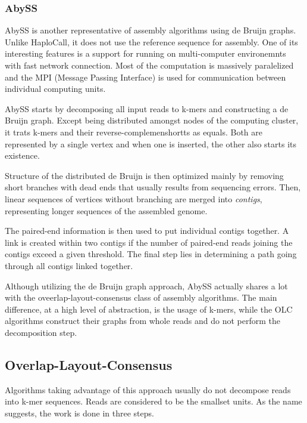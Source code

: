 \subsubsection{AbySS}
\label{subsub:abyss}

AbySS\cite{abyss} is another representative of assembly algorithms using de Bruijn graphs. Unlike HaploCall, it does not use the reference sequence for assembly. One of its interesting features is a support for running on multi-computer environemnts with fast network connection. Most of the computation is massively paralelized and the MPI (Message Passing Interface) is used for communication between individual computing units.

AbySS starts by decomposing all input reads to k-mers and constructing a de Bruijn graph. Except being distributed amongst nodes of the computing cluster, it trats k-mers and their reverse-complemenshortts as equals. Both are represented by a single vertex and when one is inserted, the other also starts its existence. 

Structure of the distributed de Bruijn is then optimized mainly by removing short branches with dead ends that usually results from sequencing errors. Then, linear sequences of vertices without branching are merged into \textit{contigs}, representing longer sequences of the assembled genome. 

The paired-end information is then used to put individual contigs together. A link is created within two contigs if the number of paired-end reads joining the contigs exceed a given threshold. The final step lies in determining a path going through all contigs linked together.

Although utilizing the de Bruijn graph approach, AbySS actually shares a lot with the oveerlap-layout-consensus class of assembly algorithms. The main difference, at a high level of abstraction, is the usage of k-mers, while the OLC algorithms construct their graphs from whole reads and do not perform the decomposition step.

\subsection{Overlap-Layout-Consensus}
\label{subsec:overlap-layout-consensus}

Algorithms taking advantage of this approach usually do not decompose reads into k-mer sequences. Reads are considered to be the smallset units. As the name suggests, the work is done in three steps.

